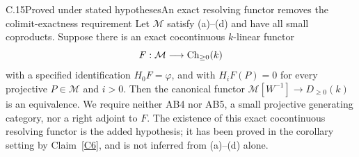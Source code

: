 \begin{claim}{C.15}{Proved under stated hypotheses}{An exact resolving functor removes the colimit-exactness requirement}\label{C15}
Let $\mathcal M$ satisfy (a)--(d) and have all small coproducts. Suppose there is an exact cocontinuous $k$-linear functor
\[
 F:\mathcal M\longrightarrow\operatorname{Ch}_{\geq0}(k)
\]
with a specified identification $H_0F=\varphi$, and with $H_iF(P)=0$ for every projective $P\in\mathcal M$ and $i>0$. Then the canonical functor $\mathcal M[W^{-1}]\to D_{\geq0}(k)$ is an equivalence. We require neither AB4 nor AB5, a small projective generating category, nor a right adjoint to $F$. The existence of this exact cocontinuous resolving functor is the added hypothesis; it has been proved in the corollary setting by Claim~\ref{C6}, and is not inferred from (a)--(d) alone.
\end{claim}
